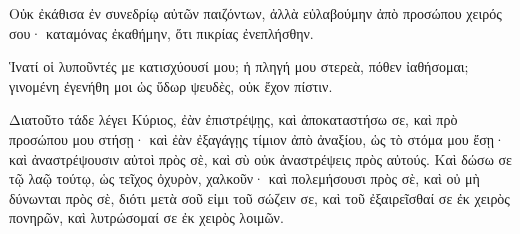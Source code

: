 {Οὐκ ἐκάθισα ἐν συνεδρίῳ αὐτῶν παιζόντων, ἀλλὰ εὐλαβούμην ἀπὸ προσώπου χειρός σου· καταμόνας ἐκαθήμην, ὅτι πικρίας ἐνεπλήσθην.
\par }{\PP {}Ἱνατί οἱ λυποῦντές με κατισχύουσί μου; ἡ πληγή μου στερεὰ, πόθεν ἰαθήσομαι; γινομένη ἐγενήθη μοι ὡς ὕδωρ ψευδὲς, οὐκ ἔχον πίστιν.
\par }{\PP {}Διατοῦτο τάδε λέγει Κύριος, ἐὰν ἐπιστρέψῃς, καὶ ἀποκαταστήσω σε, καὶ πρὸ προσώπου μου στήσῃ· καὶ ἐὰν ἐξαγάγῃς τίμιον ἀπὸ ἀναξίου, ὡς τὸ στόμα μου ἔσῃ· καὶ ἀναστρέψουσιν αὐτοὶ πρὸς σὲ, καὶ σὺ οὐκ ἀναστρέψεις πρὸς αὐτούς.
Καὶ δώσω σε τῷ λαῷ τούτῳ, ὡς τεῖχος ὀχυρὸν, χαλκοῦν· καὶ πολεμήσουσι πρὸς σὲ, καὶ οὐ μὴ δύνωνται πρὸς σὲ, διότι μετὰ σοῦ εἰμι τοῦ σώζειν σε,
καὶ τοῦ ἐξαιρεῖσθαί σε ἐκ χειρὸς πονηρῶν, καὶ λυτρώσομαί σε ἐκ χειρὸς λοιμῶν.

}
